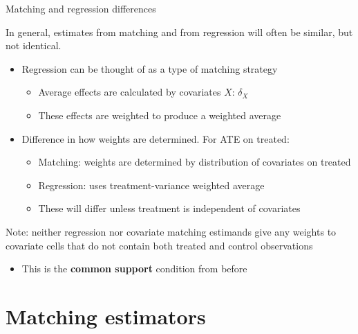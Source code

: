 \documentclass[compress, 8pt]{beamer}
\begin{document}
\begin{frame}{Matching and regression differences}

In general, estimates from matching and from regression will often be similar, but not identical.
\begin{itemize}
    \item Regression can be thought of as a type of matching strategy
    \begin{itemize}
        \item Average effects are calculated by covariates $X$: $\delta_X$
        \item These effects are weighted to produce a weighted average
    \end{itemize}

    \item Difference in how weights are determined. For ATE on treated:
    \begin{itemize}
        \item Matching: weights are determined by distribution of covariates on treated
        \item Regression: uses treatment-variance weighted average
        \item These will differ unless treatment is independent of covariates
    \end{itemize}

\end{itemize}

\vspace{3ex}
Note: neither regression nor covariate matching estimands give any weights to covariate cells that do not contain both treated and control observations
\begin{itemize}
    \item This is the \textbf{common support} condition from before
\end{itemize}
\end{frame}

\section[Estimators]{Matching estimators}
\miniframesoff
\begin{frame}
    \tableofcontents[currentsection]
\end{frame}
\miniframeson
\end{document}
